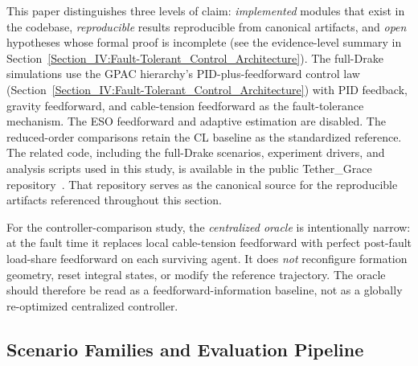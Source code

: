 This paper distinguishes three levels of claim: \textit{implemented} modules that exist in the codebase, \textit{reproducible} results reproducible from canonical artifacts, and \textit{open} hypotheses whose formal proof is incomplete (see the evidence-level summary in Section~\ref{Section_IV:Fault-Tolerant_Control_Architecture}). The full-Drake simulations use the GPAC hierarchy's PID-plus-feedforward control law (Section~\ref{Section_IV:Fault-Tolerant_Control_Architecture}) with PID feedback, gravity feedforward, and cable-tension feedforward as the fault-tolerance mechanism. The ESO feedforward and adaptive estimation are disabled. The reduced-order comparisons retain the CL baseline as the standardized reference. The related code, including the full-Drake scenarios, experiment drivers, and analysis scripts used in this study, is available in the public Tether\_Grace repository~\cite{hajieghrary2026tethergrace}. That repository serves as the canonical source for the reproducible artifacts referenced throughout this section.

For the controller-comparison study, the \emph{centralized oracle} is intentionally narrow: at the fault time it replaces local cable-tension feedforward with perfect post-fault load-share feedforward on each surviving agent. It does \emph{not} reconfigure formation geometry, reset integral states, or modify the reference trajectory. The oracle should therefore be read as a feedforward-information baseline, not as a globally re-optimized centralized controller.

\subsection{Scenario Families and Evaluation Pipeline}

